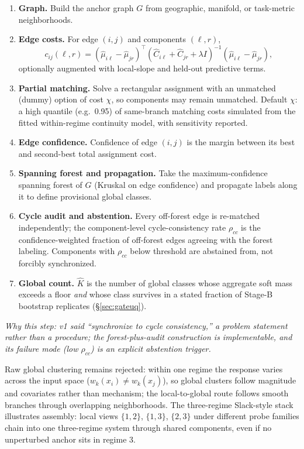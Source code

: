 \documentclass[11pt]{article}
\newcommand{\why}[1]{\par\noindent\textcolor{muted}{\small\itshape Why this step: #1}}
\begin{document}
\begin{enumerate}[label=\textbf{SYNC\arabic*.},leftmargin=3.4em]
  \item \textbf{Graph.} Build the anchor graph \(G\) from geographic, manifold, or
  task-metric neighborhoods.
  \item \textbf{Edge costs.} For edge \((i,j)\) and components \((\ell,r)\),
  \[
    c_{ij}(\ell,r)
    =(\widehat\mu_{i\ell}-\widehat\mu_{jr})^\top
     (\widehat C_{i\ell}+\widehat C_{jr}+\lambda I)^{-1}
     (\widehat\mu_{i\ell}-\widehat\mu_{jr}),
  \]
  optionally augmented with local-slope and held-out predictive terms.
  \item \textbf{Partial matching.} Solve a rectangular assignment with an unmatched
  (dummy) option of cost \(\chi\), so components may remain unmatched. Default
  \(\chi\): a high quantile (e.g.\ 0.95) of same-branch matching costs simulated from the
  fitted within-regime continuity model, with sensitivity reported.
  \item \textbf{Edge confidence.} Confidence of edge \((i,j)\) is the margin between its best
  and second-best total assignment cost.
  \item \textbf{Spanning forest and propagation.} Take the maximum-confidence spanning forest
  of \(G\) (Kruskal on edge confidence) and propagate labels along it to define provisional
  global classes.
  \item \textbf{Cycle audit and abstention.} Every off-forest edge is re-matched
  independently; the component-level cycle-consistency rate \(\rho_{cc}\) is the
  confidence-weighted fraction of off-forest edges agreeing with the forest labeling.
  Components with \(\rho_{cc}\) below threshold are abstained from, not forcibly
  synchronized.
  \item \textbf{Global count.} \(\widehat K\) is the number of global classes whose aggregate
  soft mass exceeds a floor \emph{and} whose class survives in a stated fraction of Stage-B
  bootstrap replicates (\S\ref{sec:gateuq}).
\end{enumerate}
\why{v1 said ``synchronize to cycle consistency,'' a problem statement rather than a
procedure; the forest-plus-audit construction is implementable, and its failure mode
(low \(\rho_{cc}\)) is an explicit abstention trigger.}

Raw global clustering remains rejected: within one regime the response varies across the
input space (\(w_k(x_i)\neq w_k(x_j)\)), so global clusters follow magnitude and covariates
rather than mechanism; the local-to-global route follows smooth branches through overlapping
neighborhoods. The three-regime Slack-style stack illustrates assembly: local views
\(\{1,2\}\), \(\{1,3\}\), \(\{2,3\}\) under different probe families chain into one
three-regime system through shared components, even if no unperturbed anchor sits in regime 3.
\end{document}
